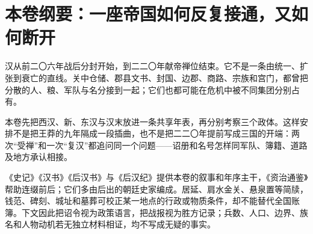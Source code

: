 \section{本卷纲要：一座帝国如何反复接通，又如何断开}

汉从前二〇六年战后分封开始，到二二〇年献帝禅位结束。它不是一条由统一、扩张到衰亡的直线。关中仓储、郡县文书、封国、边郡、商路、宗族和宫门，都曾把分散的人、粮、军队与名分接到一起；它们也都可能在危机中被不同集团分别占有。

本卷先把西汉、新、东汉与汉末放进一条共享年表，再分别考察三个政体。这样安排不是把王莽的九年隔成一段插曲，也不是把二二〇年提前写成三国的开端：两次“受禅”和一次“复汉”都追问同一个问题——诏册和名号怎样同军队、簿籍、道路及地方承认相接。

\begin{sourcenote}
《史记》《汉书》《后汉书》与《后汉纪》提供本卷的叙事和年序主干，《资治通鉴》帮助连缀前后；它们多由后出的朝廷史家编成。居延、肩水金关、悬泉置等简牍，钱范、碑刻、城址和墓葬可校正某一地点的行政或物质条件，却不能替代全国账簿。下文因此把诏令视为政策语言，把战报视为胜方记录；兵数、人口、边界、族名和人物动机若无独立材料相证，均不写成无疑的事实。
\end{sourcenote}

